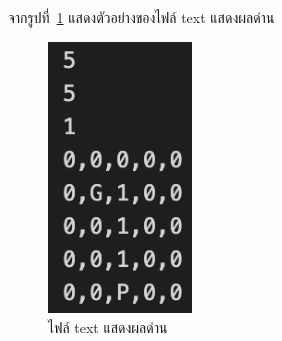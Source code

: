 จากรูปที่~\ref{ft1} แสดงตัวอย่างของไฟล์ text แสดงผลด่าน
\begin{figure}[h!]
    \begin{center}
    \includegraphics[width=1.5in]{pic-toro/filetext1.png}
    \end{center}
    \caption[Text]{ไฟล์ text แสดงผลด่าน}
    \label{ft1}
    \end{figure}

